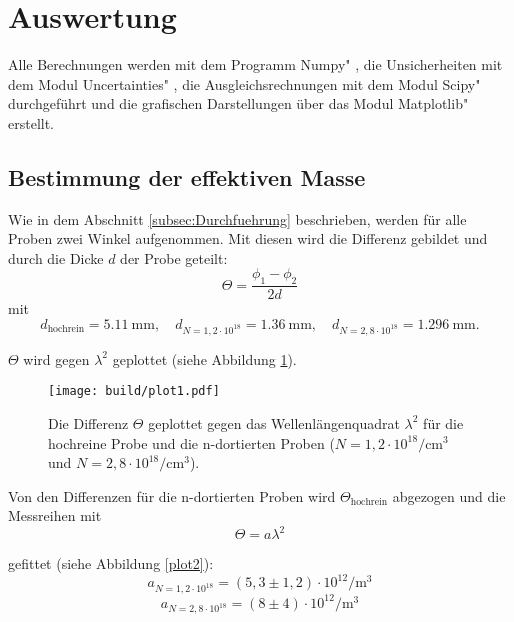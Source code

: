 \section{Auswertung}
\label{sec:Auswertung}
Alle Berechnungen werden mit dem Programm \glqq Numpy" \cite{numpy}, die Unsicherheiten mit dem Modul \glqq Uncertainties" \cite{uncertainties}, die Ausgleichsrechnungen mit dem Modul \glqq Scipy" \cite{scipy} durchgeführt und die grafischen Darstellungen über das Modul \glqq Matplotlib" \cite{matplotlib} erstellt.
\subsection{Bestimmung der effektiven Masse}
\noindent Wie in dem Abschnitt \ref{subsec:Durchfuehrung} beschrieben,
werden für alle Proben zwei Winkel aufgenommen.
Mit diesen wird die Differenz gebildet 
und durch die Dicke $d$ der Probe geteilt:
\begin{equation*}
    \Theta = \frac{\phi_1 - \phi_2}{2 d}
\end{equation*}
\noindent mit
\begin{equation*}
    d_\text{hochrein} = \qty{5.11}{\mm} ,
    \quad  d_{N=1,2 \cdot 10^{18}}= \qty{1.36}{\mm},
    \quad   d_{N=2,8 \cdot 10^{18}}= \qty{1.296}{\mm}.
\end{equation*}

\noindent $\Theta$ wird gegen $\lambda^2$ geplottet (siehe Abbildung \ref{plot1}).
\begin{figure}
    \texttt{[image: build/plot1.pdf]}
    \caption{Die Differenz $\Theta$ geplottet gegen das Wellenlängenquadrat $\lambda^2$
    für die hochreine Probe und die n-dortierten Proben 
    ($N = 1,2 \cdot 10^{18} \si{\per\cubic\cm}$ und $N = 2,8 \cdot 10^{18} \si{\per\cubic\cm}$).}
    \label{plot1}
\end{figure}

\FloatBarrier
\noindent Von den Differenzen für die n-dortierten Proben wird $\Theta_\text{hochrein}$ abgezogen
und die Messreihen mit 
\begin{equation}
    \label{ausgleich}
    \Theta = a \lambda^2
\end{equation}

\noindent gefittet (siehe Abbildung \ref{plot2}):
\begin{equation*}
    a_{N=1,2 \cdot 10^{18}} = (5,3 \pm 1,2)\cdot 10^{12} \si{\per\cubic\meter}
\end{equation*}
\begin{equation*}
    a_{N=2,8 \cdot 10^{18}} = (8 \pm 4)\cdot 10^{12} \si{\per\cubic\meter}
\end{equation*}
\FloatBarrier

